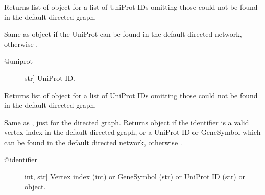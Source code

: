 \documentclass[letterpaper,10pt,english]{sphinxmanual}
\begin{document}
\begin{fulllineitems}
\begin{fulllineitems}
\begin{description}
\end{description}

\end{fulllineitems}


\begin{fulllineitems}
\label{\detokenize{main:pypath.main.PyPath.duniprots}}
Returns list of  object
for a list of UniProt IDs omitting those
could not be found in the default
directed graph.

\end{fulllineitems}


\begin{fulllineitems}
\label{\detokenize{main:pypath.main.PyPath.dup}}
Same as  object if the UniProt
can be found in the default directed network,
otherwise .
\begin{description}
\item[{@uniprot}] \leavevmode{[}str{]}
UniProt ID.

\end{description}

\end{fulllineitems}


\begin{fulllineitems}
\label{\detokenize{main:pypath.main.PyPath.dups}}
Returns list of  object
for a list of UniProt IDs omitting those
could not be found in the default
directed graph.

\end{fulllineitems}


\begin{fulllineitems}
\label{\detokenize{main:pypath.main.PyPath.dv}}
Same as , just for the directed graph.
Returns  object if the identifier
is a valid vertex index in the default directed graph,
or a UniProt ID or GeneSymbol which can be found in the
default directed network, otherwise .
\begin{description}
\item[{@identifier}] \leavevmode{[}int, str{]}
Vertex index (int) or GeneSymbol (str) or UniProt ID (str) or
 object.


\end{description}
\end{fulllineitems}
\end{fulllineitems}
\end{document}
